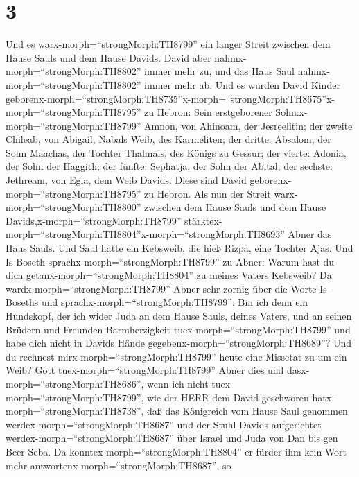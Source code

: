 \hypertarget{section-2}{%
\section{3}\label{section-2}}

 Und es warx-morph=``strongMorph:TH8799'' ein langer Streit
zwischen dem Hause Sauls und dem Hause Davids. David aber
nahmx-morph=``strongMorph:TH8802'' immer mehr zu, und das Haus Saul
nahmx-morph=``strongMorph:TH8802'' immer mehr ab.  Und es
wurden David Kinder
geborenx-morph=``strongMorph:TH8735''\textbar x-morph=``strongMorph:TH8675''x-morph=``strongMorph:TH8795''
zu Hebron: Sein erstgeborener Sohn:x-morph=``strongMorph:TH8799'' Amnon,
von Ahinoam, der Jesreelitin;  der zweite Chileab, von
Abigail, Nabals Weib, des Karmeliten; der dritte: Absalom, der Sohn
Maachas, der Tochter Thalmais, des Königs zu Gessur;  der
vierte: Adonia, der Sohn der Haggith; der fünfte: Sephatja, der Sohn der
Abital;  der sechste: Jethream, von Egla, dem Weib Davids.
Diese sind David geborenx-morph=``strongMorph:TH8795'' zu Hebron.
 Als nun der Streit warx-morph=``strongMorph:TH8800''
zwischen dem Hause Sauls und dem Hause
Davids,x-morph=``strongMorph:TH8799''
stärktex-morph=``strongMorph:TH8804''x-morph=``strongMorph:TH8693''
Abner das Haus Sauls.  Und Saul hatte ein Kebsweib, die hieß
Rizpa, eine Tochter Ajas. Und Is-Boseth
sprachx-morph=``strongMorph:TH8799'' zu Abner: Warum hast du dich
getanx-morph=``strongMorph:TH8804'' zu meines Vaters Kebsweib?
 Da wardx-morph=``strongMorph:TH8799'' Abner sehr zornig
über die Worte Is-Boseths und sprachx-morph=``strongMorph:TH8799'': Bin
ich denn ein Hundskopf, der ich wider Juda an dem Hause Sauls, deines
Vaters, und an seinen Brüdern und Freunden Barmherzigkeit
tuex-morph=``strongMorph:TH8799'' und habe dich nicht in Davids Hände
gegebenx-morph=``strongMorph:TH8689''? Und du rechnest
mirx-morph=``strongMorph:TH8799'' heute eine Missetat zu um ein Weib?
 Gott tuex-morph=``strongMorph:TH8799'' Abner dies und
dasx-morph=``strongMorph:TH8686'', wenn ich nicht
tuex-morph=``strongMorph:TH8799'', wie der HERR dem David geschworen
hatx-morph=``strongMorph:TH8738'',  daß das Königreich vom
Hause Saul genommen werdex-morph=``strongMorph:TH8687'' und der Stuhl
Davids aufgerichtet werdex-morph=``strongMorph:TH8687'' über Israel und
Juda von Dan bis gen Beer-Seba.  Da
konntex-morph=``strongMorph:TH8804'' er fürder ihm kein Wort mehr
antwortenx-morph=``strongMorph:TH8687'', so
